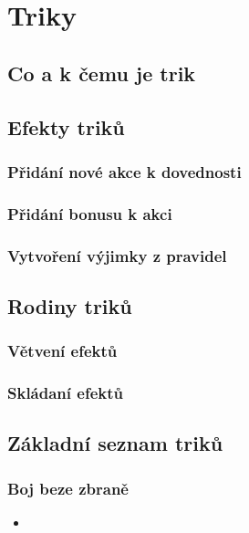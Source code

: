 \chapter{Triky}
\label{chap:triky}

\section{Co a k čemu je trik}
\label{sec:coakcemu-trik}

\section{Efekty triků}
\label{sec:trik-efekty}

\subsection{Přidání nové akce k dovednosti}
\label{sec:trik-pridani}

\subsection{Přidání bonusu k akci}
\label{sec:trik-bonus}

\subsection{Vytvoření výjimky z pravidel}
\label{sec:trik-vyjimky}

\section{Rodiny triků}
\label{sec:trik-rodiny}

\subsection{Větvení efektů}
\label{sec:trik-vetveni}

\subsection{Skládaní efektů}
\label{sec:trik-skladani}

\section{Základní seznam triků}
\label{sec:trik-zakladni}

\subsection{Boj beze zbraně}
\label{sec:trik-bbz}
\begin{itemize}
  \item
\end{itemize}
  
